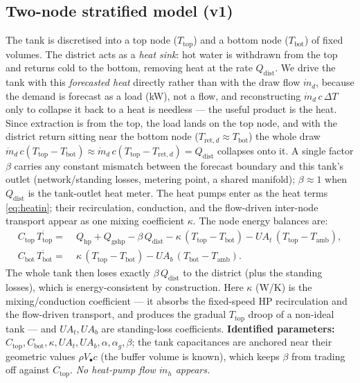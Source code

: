 \documentclass[11pt,a4paper]{article}
\newcommand{\Ttop}{T_{\mathrm{top}}}
\newcommand{\Tbot}{T_{\mathrm{bot}}}
\newcommand{\Tamb}{T_{\mathrm{amb}}}
\newcommand{\Tretd}{T_{\mathrm{ret},d}}
\newcommand{\mh}{\dot m_h}         %
\newcommand{\md}{\dot m_d}         %
\newcommand{\Qhp}{Q_{\mathrm{hp}}}
\newcommand{\cw}{c}                %
\begin{document}
\subsection{Two-node stratified model (v1)}
The tank is discretised into a top node ($\Ttop$) and a bottom node ($\Tbot$) of
fixed volumes. The district acts as a \emph{heat sink}: hot water is withdrawn from
the top and returns cold to the bottom, removing heat at the rate
$Q_{\mathrm{dist}}$. We drive the tank with this \emph{forecasted heat} directly
rather than with the draw flow $\md$, because the demand is forecast as a load (kW),
not a flow, and reconstructing $\md\,\cw\,\Delta T$ only to collapse it back to a heat
is needless --- the useful product is the heat. Since extraction is from the top, the
load lands on the top node, and with the district return sitting near the bottom node
($\Tretd\approx\Tbot$) the whole draw
$\md\,\cw(\Ttop-\Tbot)\approx\md\,\cw(\Ttop-\Tretd)=Q_{\mathrm{dist}}$ collapses onto
it. A single factor $\beta$ carries any constant mismatch between the forecast
boundary and this tank's outlet (network/standing losses, metering point, a shared
manifold); $\beta\approx1$ when $Q_{\mathrm{dist}}$ is the tank-outlet heat meter. The
heat pumps enter as the heat terms \eqref{eq:heatin}; their recirculation, conduction,
and the flow-driven inter-node transport appear as one mixing coefficient $\kappa$.
The node energy balances are:
\begin{align}
  C_{\mathrm{top}}\,\dot{\Ttop} =\;&
    \Qhp + Q_{\mathrm{gshp}}
    - \beta\,Q_{\mathrm{dist}}
    - \kappa\,(\Ttop-\Tbot)
    - UA_t\,(\Ttop-\Tamb), \label{eq:ttop}\\[2pt]
  C_{\mathrm{bot}}\,\dot{\Tbot} =\;&
    \kappa\,(\Ttop-\Tbot)
    - UA_b\,(\Tbot-\Tamb). \label{eq:tbot}
\end{align}
The whole tank then loses exactly $\beta\,Q_{\mathrm{dist}}$ to the district (plus the
standing losses), which is energy-consistent by construction. Here $\kappa$ (W/K) is
the mixing/conduction coefficient --- it absorbs the fixed-speed HP recirculation and
the flow-driven transport, and produces the gradual $\Ttop$ droop of a non-ideal tank
--- and $UA_t,UA_b$ are standing-loss coefficients. \textbf{Identified parameters:}
$C_{\mathrm{top}},C_{\mathrm{bot}},\kappa,UA_t,UA_b,\alpha,\alpha_g,\beta$; the tank
capacitances are anchored near their geometric values $\rho V_\bullet\cw$ (the buffer
volume is known), which keeps $\beta$ from trading off against $C_{\mathrm{top}}$.
\emph{No heat-pump flow $\mh$ appears.}
\end{document}
